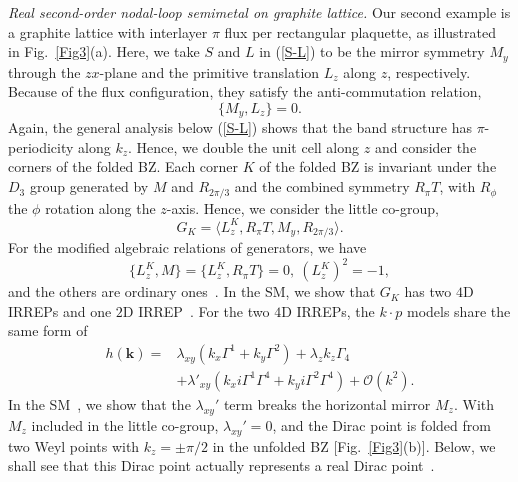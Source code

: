 \documentclass[aps,prl,twocolumn,noshowpacs,superscriptaddress]{revtex4-1}
\begin{document}
{\color{blue}\textit{Real second-order nodal-loop semimetal on graphite lattice.}} Our second example is a graphite lattice with interlayer $\pi$ flux  per rectangular plaquette, as illustrated in Fig.~\ref{Fig3}(a). Here, we take $S$ and $L$ in (\ref{S-L}) to be the mirror symmetry $M_y$ through the $zx$-plane and the primitive translation $L_z$ along $z$, respectively. Because of the flux configuration, they satisfy the anti-commutation relation,
\begin{equation} \label{M-L-projective}
\{M_y,L_z\}=0.
\end{equation}
Again, the general analysis below (\ref{S-L}) shows that the band structure has $\pi$-periodicity along $k_z$. Hence, we double the unit cell along $z$ and consider the corners of the folded BZ.  Each corner $K$ of the folded BZ is invariant under the $D_{3}$ group generated by $M$ and $R_{2\pi/3}$ and the combined symmetry $R_{\pi}T$, with $R_{\phi}$ the $\phi$ rotation along the $z$-axis. Hence, we consider the little co-group,
\begin{equation}
	G_K=\langle L_z^K, R_{\pi}T, M_y, R_{2\pi/3} \rangle.
\end{equation}
For the modified algebraic relations of generators, we have
\begin{equation}
	\{L_z^K,M\}=\{L_z^K,R_{\pi}T\}=0,~(L_z^K)^2=-1,
\end{equation}
and the others are ordinary ones~\cite{SM}. In the SM, we show that $G_K$ has two $4$D IRREPs and one $2$D IRREP~\cite{SM}. For the two $4$D IRREPs, the $k\cdot p$ models share the same form of
\begin{equation}\label{Graphite-kp}
\begin{split}
h(\bm{k})=&\lambda_{xy}(k_x\Gamma^1 + k_y\Gamma^2)+\lambda_z k_z\Gamma_4\\
&+\lambda'_{xy}(k_xi\Gamma^1\Gamma^4 + k_yi\Gamma^2\Gamma^4)+\mathcal{O}(k^2).
\end{split}
\end{equation}
In the SM~\cite{SM}, we show that the $\lambda_{xy}'$ term breaks the horizontal mirror $M_z$. With $M_z$ included in the little co-group, $\lambda_{xy}'=0$, and the Dirac point  is folded from two Weyl points with $k_z=\pm \pi/2$ in the unfolded BZ [Fig.~\ref{Fig3}(b)].  Below, we shall see that this Dirac point actually represents a real Dirac point~\cite{Zhao2017}.


\end{document}
